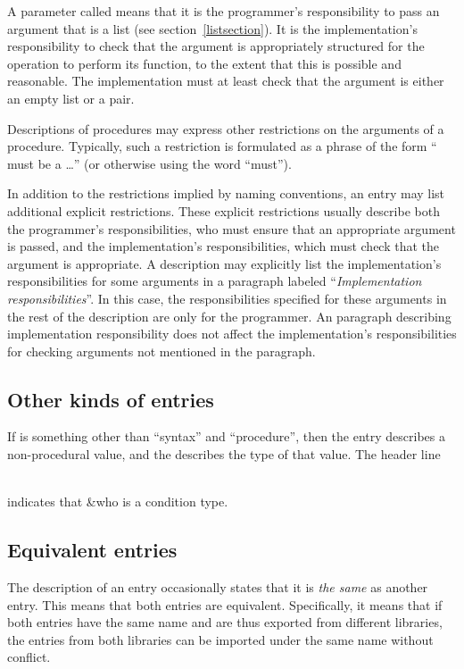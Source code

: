 A parameter called  means that it is the
programmer's responsibility to pass an argument that is a list (see
section~\ref{listsection}).  It is the implementation's responsibility
to check that the argument is appropriately structured for the
operation to perform its function, to the extent that this is possible
and reasonable.  The implementation must at least check that the
argument is either an empty list or a pair.

Descriptions of procedures may express other restrictions on the
arguments of a procedure.  Typically, such a restriction is formulated
as a phrase of the form `` must be a \ldots'' (or otherwise
using the word ``must'').

In addition to the restrictions implied by naming conventions, an
entry may list additional explicit restrictions.
These explicit restrictions usually describe both the
programmer's responsibilities, who must ensure that an appropriate
argument is passed, and the implementation's responsibilities, which
must check that the argument is appropriate.  A description
may explicitly list the implementation's responsibilities for some
arguments in a paragraph labeled ``\textit{Implementation
  responsibilities}''.  In this case, the responsibilities specified
for these arguments in the rest of the description are only for the
programmer.  An paragraph describing implementation responsibility does not
affect the implementation's responsibilities for checking arguments not
mentioned in the paragraph.

\subsection{Other kinds of entries}

If  is something other than ``syntax'' and
``procedure'', then the entry describes a non-procedural value, and
the  describes the type of that value.  The header line

\noindent{}\\
indicates that {\cf\&who} is a condition type.

\subsection{Equivalent entries}

The description of an entry occasionally states that it is \textit{the
  same} as another entry.  This means that both entries are
equivalent.  Specifically, it means that if both entries have the same
name and are thus exported from different libraries, the entries from
both libraries can be imported under the same name without conflict.

